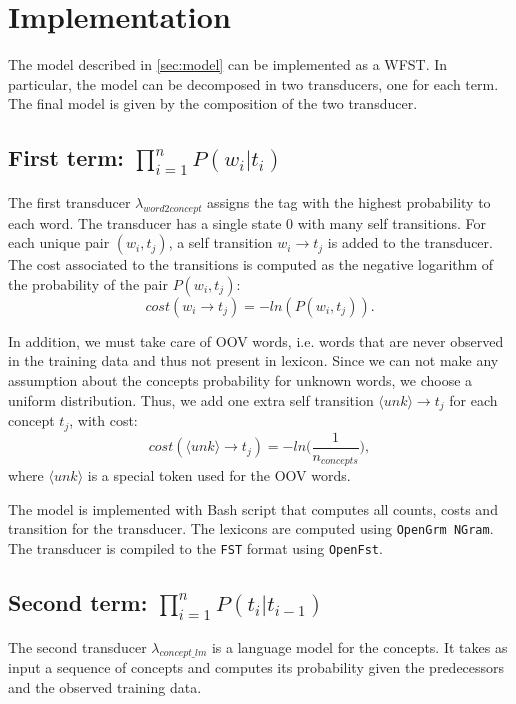 \section{Implementation}
\label{sec:implementation}

The model described in \cref{sec:model} can be implemented as a \ac{WFST}.
In particular, the model can be decomposed in two transducers, one for each term.
The final model is given by the composition of the two transducer.

\subsection{First term: $\prod_{i=1}^n P(w_i | t_i)$}
The first transducer $\lambda_{word2concept}$ assigns the tag with the highest probability to each word.
The transducer has a single state $0$ with many self transitions.
For each unique pair $(w_i, t_j)$, a self transition $w_i \rightarrow t_j$ is added to the transducer.
The cost associated to the transitions is computed as the negative logarithm of the probability of the pair $P(w_i, t_j)$:
\begin{equation*}
    cost(w_i \rightarrow t_j) = -ln(P(w_i, t_j)).
\end{equation*}

In addition, we must take care of \ac{OOV} words, i.e. words that are never observed in the training data and thus not present in lexicon.
Since we can not make any assumption about the concepts probability for unknown words, we choose a uniform distribution.
Thus, we add one extra self transition $\langle unk \rangle \rightarrow t_j$ for each concept $t_j$, with cost:
\begin{equation*}
    cost(\langle unk \rangle \rightarrow t_j) = -ln \Big( \frac{1}{n_{concepts}} \Big),
\end{equation*}
where $\langle unk \rangle$ is a special token used for the \ac{OOV} words.

The model is implemented with Bash script that computes all counts, costs and transition for the transducer.
The lexicons are computed using \texttt{OpenGrm NGram}.
The transducer is compiled to the \texttt{FST} format using \texttt{OpenFst}.

\subsection{Second term: $\prod_{i=1}^n P(t_i | t_{i-1})$}
The second transducer $\lambda_{concept\_lm}$ is a language model for the concepts.
It takes as input a sequence of concepts and computes its probability given the predecessors and the observed training data.

